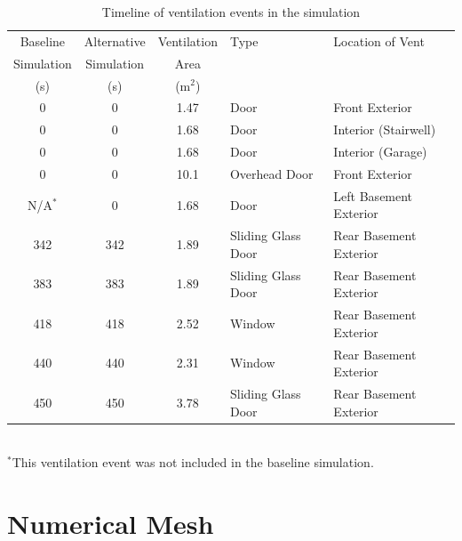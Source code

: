 \documentclass[12pt,oneside]{book}
\begin{document}
\begin{table}[!ht]
\caption[Timeline of ventilation events in the simulation]{Timeline of ventilation events in the simulation}
\begin{tabular}{cccll}
\toprule
Baseline    &  Alternative  &  Ventilation  &  Type                &  Location of Vent        \\
Simulation  &  Simulation   &  Area         &                      &                          \\
{(s)}       &  {(s)}        &  (m$^2$)      &                      &                          \\
\midrule
0           &  0            &  1.47         &  Door                &  Front Exterior          \\
0           &  0            &  1.68         &  Door                &  Interior (Stairwell)    \\
0           &  0            &  1.68         &  Door                &  Interior (Garage)       \\
0           &  0            &  10.1         &  Overhead Door       &  Front Exterior          \\
N/A$^*$     &  0            &  1.68         &  Door                &  Left Basement Exterior  \\
342         &  342          &  1.89         &  Sliding Glass Door  &  Rear Basement Exterior  \\
383         &  383          &  1.89         &  Sliding Glass Door  &  Rear Basement Exterior  \\
418         &  418          &  2.52         &  Window              &  Rear Basement Exterior  \\
440         &  440          &  2.31         &  Window              &  Rear Basement Exterior  \\
450         &  450          &  3.78         &  Sliding Glass Door  &  Rear Basement Exterior  \\
\bottomrule
\end{tabular}
\footnotesize
\\$^*$This ventilation event was not included in the baseline simulation.
\normalsize
\label{tab:ventilation_timeline}
\end{table}

\section{Numerical Mesh}
\label{sec:numerical_mesh}
\end{document}
